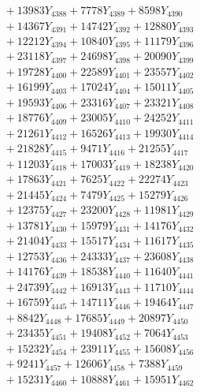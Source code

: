 \documentclass[a4paper,10pt]{article}
\begin{document}
{\begin{align}
&\;  + 13983 Y_{4388} + 7778 Y_{4389} + 8598 Y_{4390} \\[0.3ex]
&\;  + 14367 Y_{4391} + 14742 Y_{4392} + 12880 Y_{4393} \\[0.3ex]
&\;  + 12212 Y_{4394} + 10840 Y_{4395} + 11179 Y_{4396} \\[0.3ex]
&\;  + 23118 Y_{4397} + 24698 Y_{4398} + 20090 Y_{4399} \\[0.3ex]
&\;  + 19728 Y_{4400} + 22589 Y_{4401} + 23557 Y_{4402} \\[0.3ex]
&\;  + 16199 Y_{4403} + 17024 Y_{4404} + 15011 Y_{4405} \\[0.3ex]
&\;  + 19593 Y_{4406} + 23316 Y_{4407} + 23321 Y_{4408} \\[0.5ex]\allowbreak
&\;  + 18776 Y_{4409} + 23005 Y_{4410} + 24252 Y_{4411} \\[0.3ex]
&\;  + 21261 Y_{4412} + 16526 Y_{4413} + 19930 Y_{4414} \\[0.3ex]
&\;  + 21828 Y_{4415} + 9471 Y_{4416} + 21255 Y_{4417} \\[0.3ex]
&\;  + 11203 Y_{4418} + 17003 Y_{4419} + 18238 Y_{4420} \\[0.3ex]
&\;  + 17863 Y_{4421} + 7625 Y_{4422} + 22274 Y_{4423} \\[0.3ex]
&\;  + 21445 Y_{4424} + 7479 Y_{4425} + 15279 Y_{4426} \\[0.3ex]
&\;  + 12375 Y_{4427} + 23200 Y_{4428} + 11981 Y_{4429} \\[0.3ex]
&\;  + 13781 Y_{4430} + 15979 Y_{4431} + 14176 Y_{4432} \\[0.3ex]
&\;  + 21404 Y_{4433} + 15517 Y_{4434} + 11617 Y_{4435} \\[0.3ex]
&\;  + 12753 Y_{4436} + 24333 Y_{4437} + 23608 Y_{4438} \\[0.5ex]\allowbreak
&\;  + 14176 Y_{4439} + 18538 Y_{4440} + 11640 Y_{4441} \\[0.3ex]
&\;  + 24739 Y_{4442} + 16913 Y_{4443} + 11710 Y_{4444} \\[0.3ex]
&\;  + 16759 Y_{4445} + 14711 Y_{4446} + 19464 Y_{4447} \\[0.3ex]
&\;  + 8842 Y_{4448} + 17685 Y_{4449} + 20897 Y_{4450} \\[0.3ex]
&\;  + 23435 Y_{4451} + 19408 Y_{4452} + 7064 Y_{4453} \\[0.3ex]
&\;  + 15232 Y_{4454} + 23911 Y_{4455} + 15608 Y_{4456} \\[0.3ex]
&\;  + 9241 Y_{4457} + 12606 Y_{4458} + 7388 Y_{4459} \\[0.3ex]
&\;  + 15231 Y_{4460} + 10888 Y_{4461} + 15951 Y_{4462} \\[0.3ex]

\end{align}}
\end{document}
